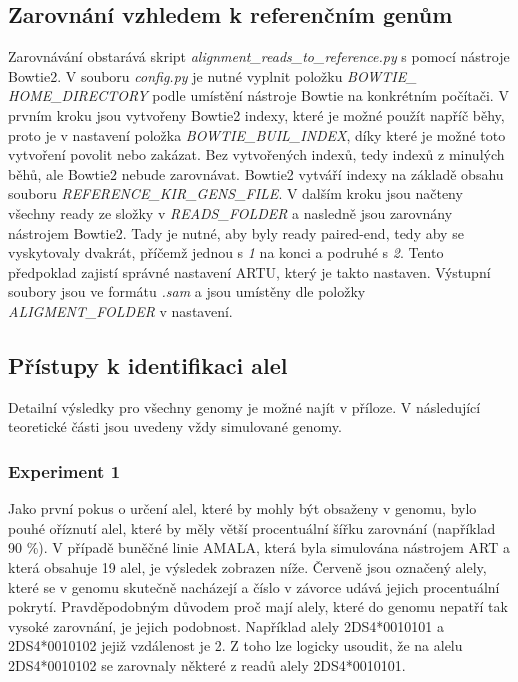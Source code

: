 \documentclass[czech,DP]{thesiskiv}
\numberwithin{equation}{section}
\begin{document}
\subsection{Zarovnání vzhledem k referenčním genům}
Zarovnávání obstarává skript \textit{alignment\_reads\_to\_reference.py} s pomocí nástroje Bowtie2. V souboru \textit{config.py} je nutné vyplnit položku \textit{BOWTIE\_} \\ \textit{HOME\_DIRECTORY} podle umístění nástroje Bowtie na konkrétním počítači. V prvním kroku jsou vytvořeny Bowtie2 indexy, které je možné použít napříč běhy, proto je v nastavení položka \textit{BOWTIE\_BUIL\_INDEX}, díky které je možné toto vytvoření povolit nebo zakázat. Bez vytvořených indexů, tedy indexů z minulých běhů, ale Bowtie2 nebude zarovnávat. Bowtie2 vytváří indexy na základě obsahu souboru \textit{REFERENCE\_KIR\_GENS\_FILE}. V dalším kroku jsou načteny všechny ready ze složky v \textit{READS\_FOLDER} a nasledně jsou zarovnány nástrojem Bowtie2. Tady je nutné, aby byly ready paired-end, tedy aby se vyskytovaly dvakrát, příčemž jednou s \textit{1} na konci a podruhé s \textit{2}. Tento předpoklad zajistí správné nastavení ARTU, který je takto nastaven. Výstupní soubory jsou ve formátu \textit{.sam} a jsou umístěny dle položky \textit{ALIGMENT\_FOLDER} v nastavení. 

\subsection{Přístupy k identifikaci alel}
Detailní výsledky pro všechny genomy je možné najít v příloze. V následující teoretické části jsou uvedeny vždy simulované genomy.

\subsubsection{Experiment 1}
Jako první pokus o určení alel, které by mohly být obsaženy v genomu, bylo pouhé oříznutí alel, které by měly větší procentuální šířku zarovnání (například 90 \%).  V případě buněčné linie AMALA, která byla simulována nástrojem ART a která obsahuje 19 alel, je výsledek zobrazen níže. Červeně jsou označený alely, které se v genomu skutečně nacházejí a číslo v závorce udává jejich procentuální pokrytí. Pravděpodobným důvodem proč mají alely, které do genomu nepatří tak vysoké zarovnání, je jejich podobnost. Například alely 2DS4*0010101 a 2DS4*0010102 jejiž vzdálenost je 2. Z toho lze logicky usoudit, že na alelu 2DS4*0010102 se zarovnaly některé z readů alely 2DS4*0010101.
\end{document}
